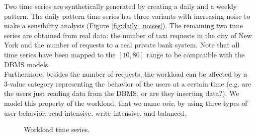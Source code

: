\documentclass[a4paper, 12pt]{article} %
\begin{document}
	Two time series are synthetically generated by creating a daily and a weekly pattern. The daily pattern time series has three variants with increasing noise to make a sensibility analysis (Figure \ref{fig:daily_noises}). The remaining two time series are obtained from real data: the number of taxi requests in the city of New York \cite{TaxiDataset} and the number of requests to a real private bank system. Note that all time series have been mapped to the $[10, 80]$ range to be compatible with the DBMS models. \\
	Furthermore, besides the number of requests, the workload can be affected by a 3-value category representing the behavior of the users at a certain time (e.g. are the users just reading data from the DBMS, or are they inserting data?). We model this property of the workload, that we name \textit{mix}, by using three types of user behavior: read-intensive, write-intensive, and balanced.
	\begin{figure}\centering
		 \hfill
		
		\caption{Workload time series.}
		\label{fig:time_series}
	\end{figure}
	
\end{document}
